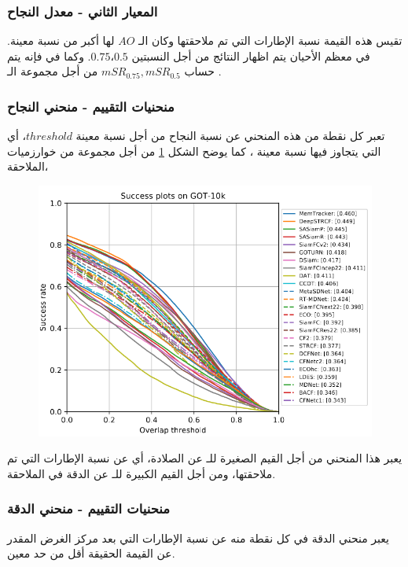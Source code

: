 \subsubsection{المعيار الثاني - معدل النجاح
}
تقيس هذه القيمة نسبة الإطارات التي تم ملاحقتها وكان الـ
$AO$
لها
أكبر من نسبة معينة.
في معظم الأحيان يتم اظهار النتائج من أجل النسبتين 
$0.75،0.5$.
وكما في 
فإنه يتم حساب 
$mSR_{0.75},mSR_{0.5}$
من أجل مجموعة الـ
.
\subsubsection{منحنيات التقييم - منحني النجاح 
}
تعبر كل نقطة من هذه المنحني عن نسبة النجاح من أجل نسبة معينة
$threshold$،
أي التي يتجاوز فيها 
نسبة معينة
،
كما يوضح الشكل
\ref{fig:got10k_SuccessCurve}
من أجل مجموعة من خوارزميات الملاحقة،
\begin{figure}[!h]
	\centerline{\includegraphics[width=\textwidth]{images/got10k_SuccessCurve}}
	\caption{
		}
	\label{fig:got10k_SuccessCurve}
\end{figure}
يعبر هذا المنحني من أجل القيم الصغيرة للـ
عن الصلادة، أي عن نسبة الإطارات التي تم ملاحقتها، ومن أجل القيم الكبيرة للـ
عن الدقة في الملاحقة.
\subsubsection{منحنيات التقييم - منحني الدقة 
	}
يعبر منحني الدقة في كل نقطة منه عن نسبة الإطارات التي بعد مركز الغرض المقدر عن القيمة الحقيقة أقل من حد معين.
